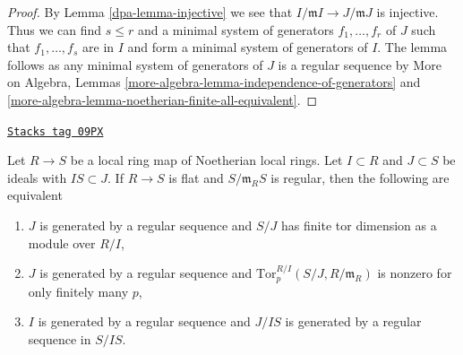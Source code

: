 \begin{proof}

By Lemma \ref{dpa-lemma-injective} we see that
$I/\mathfrak m I \to J/\mathfrak m J$
is injective. Thus we can find $s \leq r$ and a minimal system of
generators $f_1, \ldots, f_r$ of $J$ such that $f_1, \ldots, f_s$ are in $I$
and form a minimal system of generators of $I$.
The lemma follows as any minimal system of generators of $J$
is a regular sequence by
More on Algebra, Lemmas
\ref{more-algebra-lemma-independence-of-generators} and
\ref{more-algebra-lemma-noetherian-finite-all-equivalent}.
\end{proof}

\begin{lemma}
\label{dpa-lemma-perfect-map-ci}
\href{https://stacks.math.columbia.edu/tag/09PX}{\texttt{Stacks tag 09PX}}

Let $R \to S$ be a local ring map of Noetherian local rings.
Let $I \subset R$ and $J \subset S$ be ideals with
$IS \subset J$. If $R \to S$ is flat and $S/\mathfrak m_RS$ is
regular, then the following are equivalent
\begin{enumerate}
\item $J$ is generated by a regular sequence and
$S/J$ has finite tor dimension as a module over $R/I$,
\item $J$ is generated by a regular sequence and
$\text{Tor}^{R/I}_p(S/J, R/\mathfrak m_R)$ is nonzero
for only finitely many $p$,
\item $I$ is generated by a regular sequence
and $J/IS$ is generated by a regular sequence in $S/IS$.
\end{enumerate}
\end{lemma}

